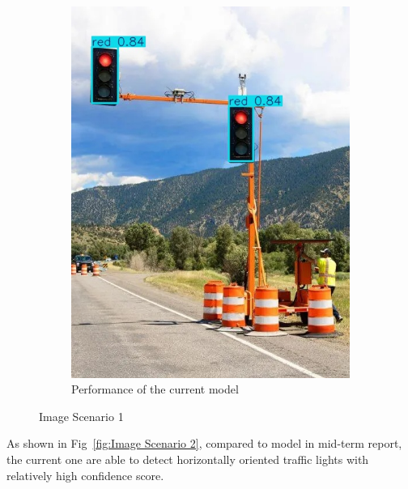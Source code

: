\documentclass[journal,transmag]{IEEEtran}
\begin{document}
\begin{figure}[h]
\begin{subfigure}[b]{0.225\textwidth}
        \includegraphics[width=\textwidth]{Result_1_new.jpg}
        \caption{Performance of the current model
}
        \label{fig:Result_1_new}
    \end{subfigure}
    \caption{Image Scenario 1}
    \label{fig:Image Scenario 1}
\end{figure}

As shown in Fig~\ref{fig:Image Scenario 2}, compared to model in mid-term report, the current one are able to detect horizontally oriented traffic lights with relatively high confidence score. 
\end{document}
